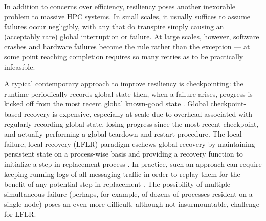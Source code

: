 In addition to concerns over efficiency, resiliency poses another inexorable problem to massive HPC systems.
In small scales, it usually suffices to assume failures occur negligibly, with any that do transpire simply causing an (acceptably rare) global interruption or failure.
At large scales, however, software crashes and hardware failures become the rule rather than the exception \cite{dongarra2014applied} --- at some point reaching completion requires so many retries as to be practically infeasible.

A typical contemporary approach to improve resiliency is checkpointing: the runtime periodically records global state then, when a failure arises, progress is kicked off from the most recent global known-good state \cite{hursey2007design}.
Global checkpoint-based recovery is expensive, especially at scale due to overhead associated with regularly recording global state, losing progress since the most recent checkpoint, and actually performing a global teardown and restart procedure.
The local failure, local recovery (LFLR) paradigm eschews global recovery by maintaining persistent state on a process-wise basis and providing a recovery function to initialize a step-in replacement process \cite{heroux2014toward,teranishi2014toward}.
In practice, such an approach can require keeping running logs of all messaging traffic in order to replay them for the benefit of any potential step-in replacement \cite{chakravorty2004fault}.
The possibility of multiple simultaneous failure (perhaps, for example, of dozens of processes resident on a single node) poses an even more difficult, although not insurmountable, challenge for LFLR.

